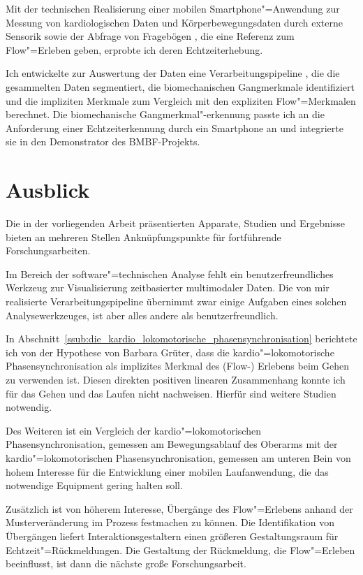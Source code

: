 \label{sub:technische_beitrage}

Mit der technischen Realisierung einer mobilen Smartphone"=Anwendung zur Messung von kardiologischen Daten und Körperbewegungsdaten durch externe Sensorik sowie der Abfrage von Fragebögen \citep{Bogutzky2016}, die eine Referenz zum Flow"=Erleben geben, erprobte ich deren Echtzeiterhebung. 

Ich entwickelte zur Auswertung der Daten eine Verarbeitungspipeline \citep{Bogutzky2016a}, die die gesammelten Daten segmentiert, die biomechanischen Gangmerkmale identifiziert und die impliziten Merkmale zum Vergleich mit den expliziten Flow"=Merkmalen berechnet. Die biomechanische Gangmerkmal"-erkennung passte ich an die Anforderung einer Echtzeiterkennung durch ein Smartphone an und integrierte sie in den Demonstrator des \acs{BMBF}-Projekts. 

\section{Ausblick} \label{sec:ausblick} Die in der vorliegenden Arbeit präsentierten Apparate, Studien und Ergebnisse bieten an mehreren Stellen Anknüpfungspunkte für fortführende Forschungsarbeiten.

Im Bereich der software"=technischen Analyse fehlt ein benutzerfreundliches Werkzeug zur Visualisierung zeitbasierter multimodaler Daten. Die von mir realisierte Verarbeitungspipeline übernimmt zwar einige Aufgaben eines solchen Analysewerkzeuges, ist aber alles andere als benutzerfreundlich. 

In Abschnitt~\ref{ssub:die_kardio_lokomotorische_phasensynchronisation} berichtete ich von der Hypothese von Barbara Grüter, dass die kardio"=lokomotorische Phasensynchronisation als implizites Merkmal des (Flow-) Erlebens beim Gehen zu verwenden ist. Diesen direkten positiven linearen Zusammenhang konnte ich für das Gehen und das Laufen nicht nachweisen. Hierfür sind weitere Studien notwendig.

Des Weiteren ist ein Vergleich der kardio"=lokomotorischen Phasensynchronisation, gemessen am Bewegungsablauf des Oberarms mit der kardio"=lokomotorischen Phasensynchronisation, gemessen am unteren Bein von hohem Interesse für die Entwicklung einer mobilen Laufanwendung, die das notwendige Equipment gering halten soll.

Zusätzlich ist von höherem Interesse, Übergänge des Flow"=Erlebens anhand der Musterveränderung im Prozess festmachen zu können. Die Identifikation von Übergängen liefert Interaktionsgestaltern einen größeren Gestaltungsraum für Echtzeit"=Rückmeldungen. Die Gestaltung der Rückmeldung, die Flow"=Erleben beeinflusst, ist dann die nächste große Forschungsarbeit.

